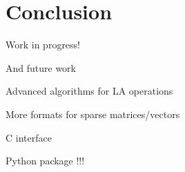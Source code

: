 \section{Conclusion}

Work in progress!

And future work

Advanced algorithms for LA operations

More formats for sparse matrices/vectors

C interface

Python package
!!!